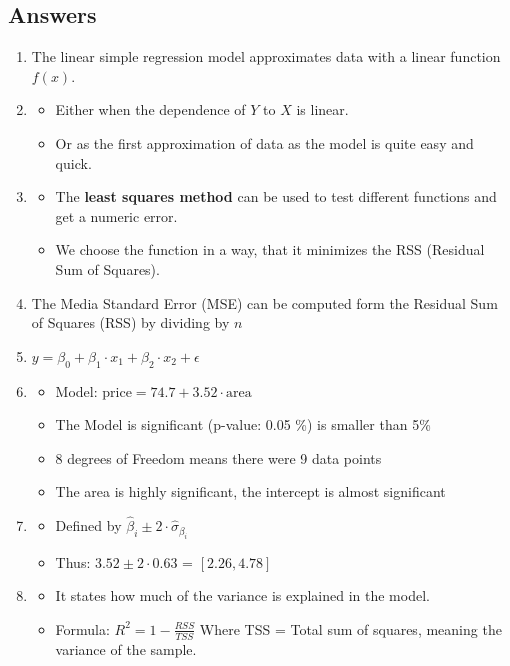 \documentclass[11pt]{article}
\begin{document}
    \subsection*{Answers}
    \begin{enumerate}
        \item The linear simple regression model approximates data with a linear function $f(x)$.
        \item \begin{itemize}
                  \item Either when the dependence of $Y$ to $X$ is linear.
                  \item Or as the first approximation of data as the model is quite easy and quick.
        \end{itemize}
        \item \begin{itemize}
                  \item The \textbf{least squares method} can be used to test different functions and get a numeric error.
                  \item We choose the function in a way, that it minimizes the RSS (Residual Sum of Squares).
        \end{itemize}
        \item The Media Standard Error (MSE) can be computed form the Residual Sum of Squares (RSS) by dividing by $n$
        \item $y = \beta_0 + \beta_1 \cdot x_1 + \beta_2 \cdot x_2 + \epsilon$
        \item \begin{itemize}
                  \item Model: $\text{price} = 74.7 + 3.52 \cdot \text{area}$
                  \item The Model is significant (p-value: 0.05 \%) is smaller than 5\%
                  \item 8 degrees of Freedom means there were 9 data points
                  \item The area is highly significant, the intercept is almost significant
        \end{itemize}
        \item \begin{itemize}
                  \item Defined by $\hat{\beta}_i \pm 2 \cdot \hat{\sigma}_{\beta_i}$
                  \item Thus: $3.52 \pm 2 \cdot 0.63$ = $[2.26, 4.78]$
        \end{itemize}
        \item     \begin{itemize}
                      \item It states how much of the variance is explained in the model.
                      \item Formula: $R^2 = 1 - \frac{RSS}{TSS}$ Where TSS = Total sum of squares, meaning the variance
                      of the sample.
        \end{itemize}
    \end{enumerate}
\end{document}
